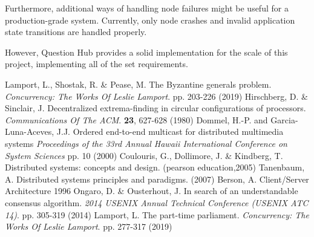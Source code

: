 \documentclass[runningheads]{llncs}
\begin{document}
Furthermore, additional ways of handling node failures might be useful for a production-grade system. Currently, only node crashes and invalid application state transitions are handled properly. 

However, Question Hub provides a solid implementation for the scale of this project, implementing all of the set requirements.

\begin{thebibliography}{8}
    Lamport, L., Shostak, R. \& Pease, M. The Byzantine generals problem. {\em Concurrency: The Works Of Leslie Lamport}. pp. 203-226 (2019)
    Hirschberg, D. \& Sinclair, J. Decentralized extrema-finding in circular configurations of processors. {\em Communications Of The ACM}. \textbf{23}, 627-628 (1980)
    Dommel, H.-P. and Garcia-Luna-Aceves, J.J. Ordered end-to-end multicast for distributed multimedia systems {\em Proceedings of the 33rd Annual Hawaii International Conference on System Sciences} pp. 10 (2000)
    Coulouris, G., Dollimore, J. \& Kindberg, T. Distributed systems: concepts and design. (pearson education,2005)
    Tanenbaum, A. Distributed systems principles and paradigms.  (2007)
     Berson, A. Client/Server Architecture 1996
    Ongaro, D. \& Ousterhout, J. In search of an understandable consensus algorithm. {\em 2014 USENIX Annual Technical Conference (USENIX ATC 14)}. pp. 305-319 (2014)
    Lamport, L. The part-time parliament. {\em Concurrency: The Works Of Leslie Lamport}. pp. 277-317 (2019)
\end{thebibliography}
\end{document}
